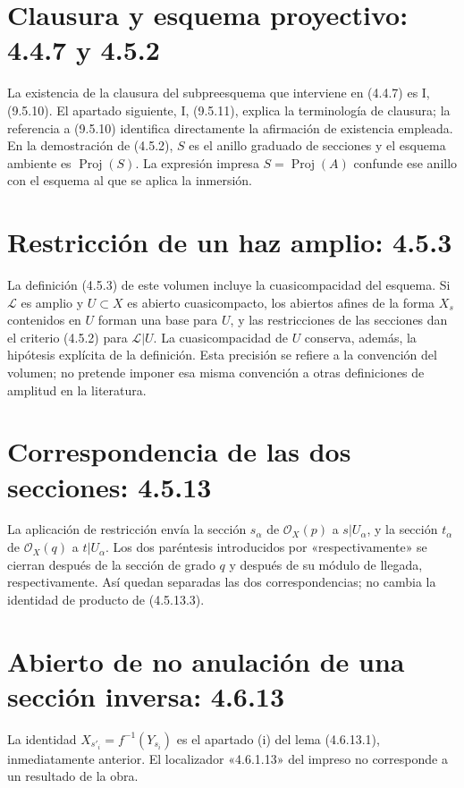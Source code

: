 \documentclass[11pt,a4paper]{article}
\DeclareMathOperator{\Proj}{Proj}
\begin{document}
\section{Clausura y esquema proyectivo: 4.4.7 y 4.5.2}
La existencia de la clausura del subpreesquema que interviene en
(4.4.7) es I, (9.5.10). El apartado siguiente, I, (9.5.11), explica
la terminología de clausura; la referencia a (9.5.10) identifica
directamente la afirmación de existencia empleada.
En la demostración de (4.5.2), $S$ es el anillo graduado de secciones
y el esquema ambiente es $\Proj(S)$. La expresión impresa
$S=\Proj(A)$ confunde ese anillo con el esquema al que se aplica
la inmersión.

\section{Restricción de un haz amplio: 4.5.3}
La definición (4.5.3) de este volumen incluye la cuasicompacidad
del esquema. Si $\mathcal L$ es amplio y $U\subset X$ es abierto
cuasicompacto, los abiertos afines de la forma $X_s$ contenidos
en $U$ forman una base para $U$, y las restricciones de las secciones
dan el criterio (4.5.2) para $\mathcal L|U$.
La cuasicompacidad de $U$ conserva, además, la hipótesis explícita
de la definición. Esta precisión se refiere a la convención del
volumen; no pretende imponer esa misma convención a otras
definiciones de amplitud en la literatura.

\section{Correspondencia de las dos secciones: 4.5.13}
La aplicación de restricción envía la sección $s_\alpha$ de
$\mathcal O_X(p)$ a $s|U_\alpha$, y la sección $t_\alpha$ de
$\mathcal O_X(q)$ a $t|U_\alpha$. Los dos paréntesis introducidos
por «respectivamente» se cierran después de la sección de grado
$q$ y después de su módulo de llegada, respectivamente.
Así quedan separadas las dos correspondencias; no cambia la
identidad de producto de (4.5.13.3).

\section{Abierto de no anulación de una sección inversa: 4.6.13}
La identidad $X_{s'_i}=f^{-1}(Y_{s_i})$ es el apartado (i) del
lema (4.6.13.1), inmediatamente anterior. El localizador
«4.6.1.13» del impreso no corresponde a un resultado de la obra.
\end{document}
